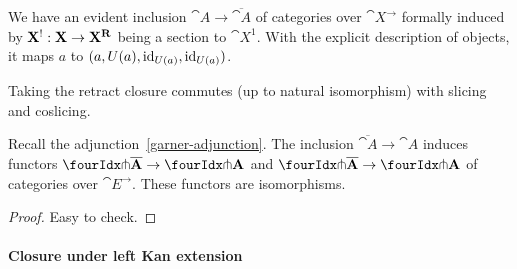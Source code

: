 \documentclass[reqno,10pt,a4paper,oneside]{amsart}
\begin{document}
We have an evident inclusion $\cat{A} \to \overline{\cat{A}}$ of categories over $\cat{X}^{\to}$ formally induced by $\mathbf{X}^{\mathord{!}} : \mathbf{X} \to \mathbf{X}^{\mathbf{R}}$ being a section to $\cat{X}^1$.
With the explicit description of objects, it maps $a$ to $(a, U(a), \operatorname{id}_{U(a)}, \operatorname{id}_{U(a)})$.

\begin{remark}
\label{retract-closure-slicing}
Taking the retract closure commutes (up to natural isomorphism) with slicing and coslicing.
\end{remark}

\begin{lemma}
\label{retract-closure}
Recall the adjunction~\eqref{garner-adjunction}.
The inclusion $\overline{\cat{A}} \to \cat{A}$ induces functors $\liftl{\overline{\cat{A}}} \to \liftl{\cat{A}}$ and $\liftr{\overline{\cat{A}}} \to \liftr{\cat{A}}$ of categories over $\cat{E}^{\to}$.
These functors are isomorphisms.
\end{lemma}

\begin{proof}
Easy to check.
\end{proof}

\paragraph{Closure under left Kan extension}
\end{document}

